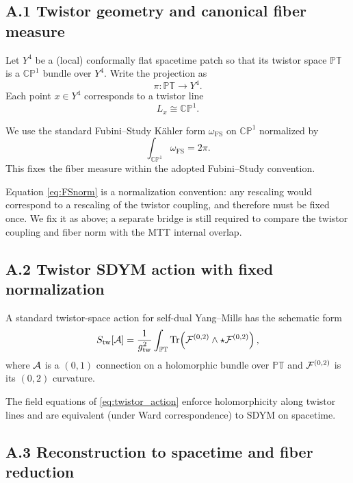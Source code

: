 \documentclass[11pt]{article}
\begin{document}
\subsection{A.1 Twistor geometry and canonical fiber measure}

Let $Y^4$ be a (local) conformally flat spacetime patch so that its twistor space
$\mathbb{PT}$ is a $\mathbb{CP}^1$ bundle over $Y^4$.
Write the projection as
\[
\pi:\mathbb{PT}\to Y^4.
\]
Each point $x\in Y^4$ corresponds to a twistor line
\[
L_x \cong \mathbb{CP}^1.
\]

We use the standard Fubini--Study K\"ahler form $\omega_{\mathrm{FS}}$ on $\mathbb{CP}^1$
normalized by
\begin{equation}
\int_{\mathbb{CP}^1}\omega_{\mathrm{FS}} = 2\pi.
\label{eq:FSnorm}
\end{equation}
This fixes the fiber measure within the adopted Fubini--Study convention.

\begin{remark}
Equation \eqref{eq:FSnorm} is a normalization convention: any rescaling would
correspond to a rescaling of the twistor coupling, and therefore must be fixed once.
We fix it as above; a separate bridge is still required to compare the twistor
coupling and fiber norm with the MTT internal overlap.
\end{remark}

\subsection{A.2 Twistor SDYM action with fixed normalization}

A standard twistor-space action for self-dual Yang--Mills has the schematic form
\begin{equation}
S_{\mathrm{tw}}[{\cal A}]
=
\frac{1}{g_{\mathrm{tw}}^2}
\int_{\mathbb{PT}}
\mathrm{Tr}\!\left(
{\cal F}^{(0,2)} \wedge \star {\cal F}^{(0,2)}
\right),
\label{eq:twistor_action}
\end{equation}
where ${\cal A}$ is a $(0,1)$ connection on a holomorphic bundle over $\mathbb{PT}$
and ${\cal F}^{(0,2)}$ is its $(0,2)$ curvature.

The field equations of \eqref{eq:twistor_action} enforce holomorphicity along
twistor lines and are equivalent (under Ward correspondence) to SDYM on spacetime.

\subsection{A.3 Reconstruction to spacetime and fiber reduction}
\end{document}
